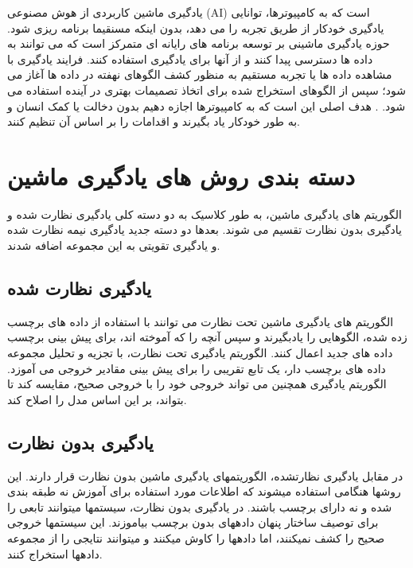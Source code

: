 


یادگیری ماشین کاربردی از هوش مصنوعی (AI) است که به کامپیوترها، توانایی یادگیری خودکار از طریق تجربه  را می دهد، بدون اینکه مسنقیما برنامه ریزی شود. حوزه یادگیری ماشینی بر توسعه برنامه های رایانه ای متمرکز است که می توانند به داده ها دسترسی پیدا کنند و از آنها برای یادگیری استفاده کنند. فرایند یادگیری با مشاهده داده ها یا تجربه مستقیم  به منظور کشف الگوهای نهفته در داده ها آغاز می شود؛  سپس از الگوهای  استخراج شده برای اتخاذ تصمیمات بهتری در آینده استفاده می شود. . هدف اصلی این است که به کامپیوترها اجازه دهیم بدون دخالت یا کمک انسان و به طور خودکار یاد بگیرند و اقدامات را بر اساس آن تنظیم کنند.

\section{دسته بندی روش های یادگیری ماشین}
الگوریتم های یادگیری ماشین، به طور کلاسیک به دو دسته کلی یادگیری نظارت شده و یادگیری بدون نظارت تقسیم می شوند. بعدها دو دسته جدید یادگیری نیمه نظارت شده و یادگیری تقویتی به این مجموعه اضافه شدند.
\subsection{یادگیری نظارت شده}

الگوریتم های یادگیری ماشین تحت نظارت می توانند  با استفاده از داده های برچسب زده شده، الگوهایی  را یادبگیرند و سپس آنچه را که آموخته اند، برای پیش بینی برچسب داده های جدید اعمال کنند. الگوریتم یادگیری تحت نظارت، با تجزیه و تحلیل مجموعه داده های برچسب دار، یک تابع تقریبی را برای پیش بینی مقادیر خروجی می آموزد. الگوریتم یادگیری همچنین می تواند خروجی خود را با خروجی صحیح، مقایسه کند تا بتواند، بر این اساس مدل را اصلاح کند.

\subsection{یادگیری بدون نظارت}

در مقابل  یادگیری نظارت\nf شده، الگوریتم\nf های یادگیری ماشین بدون نظارت قرار دارند. این روش\nf ها هنگامی استفاده می\nf شوند که اطلاعات مورد استفاده برای آموزش نه طبقه بندی شده و نه دارای برچسب باشند. در یادگیری بدون نظارت، سیستم\nf ها می\nf توانند تابعی را برای توصیف ساختار پنهان داده\nf های بدون برچسب بیاموزند. این سیستم\nf ها خروجی صحیح را کشف نمی\nf کنند، اما داده\nf ها را کاوش می\nf کنند و می\nf توانند نتایجی را از مجموعه داده\nf ها استخراج کنند.

